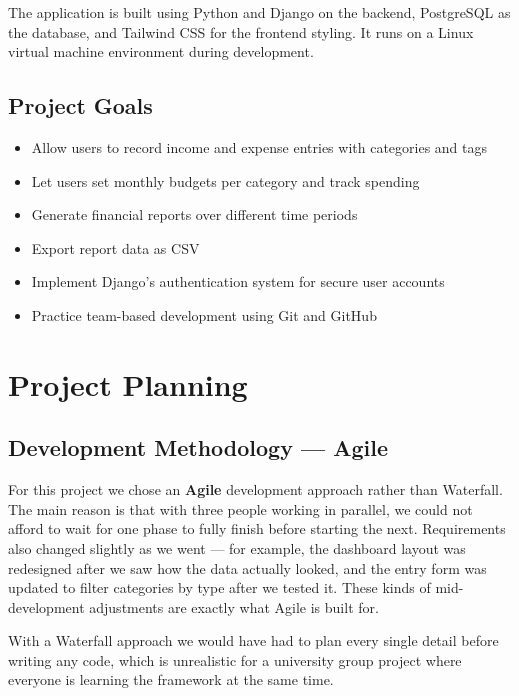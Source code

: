\documentclass[12pt,a4paper]{report}
\begin{document}
The application is built using Python and Django on the backend, PostgreSQL as the database, and Tailwind CSS for the frontend styling. It runs on a Linux virtual machine environment during development.

\section{Project Goals}

\begin{itemize}
  \item Allow users to record income and expense entries with categories and tags
  \item Let users set monthly budgets per category and track spending
  \item Generate financial reports over different time periods
  \item Export report data as CSV
  \item Implement Django's authentication system for secure user accounts
  \item Practice team-based development using Git and GitHub
\end{itemize}

\chapter{Project Planning}

\section{Development Methodology --- Agile}

For this project we chose an \textbf{Agile} development approach rather than Waterfall. The main reason is that with three people working in parallel, we could not afford to wait for one phase to fully finish before starting the next. Requirements also changed slightly as we went --- for example, the dashboard layout was redesigned after we saw how the data actually looked, and the entry form was updated to filter categories by type after we tested it. These kinds of mid-development adjustments are exactly what Agile is built for.

With a Waterfall approach we would have had to plan every single detail before writing any code, which is unrealistic for a university group project where everyone is learning the framework at the same time.
\end{document}
